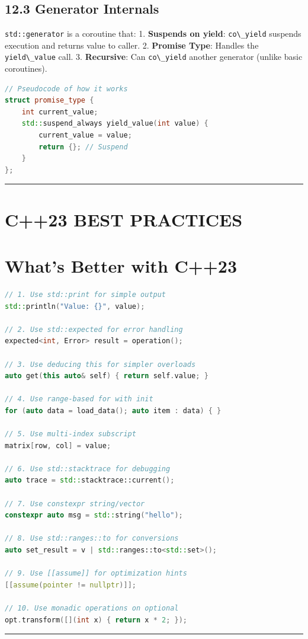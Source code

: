 \hypertarget{generator-internals}{%
\subsection{12.3 Generator Internals}\label{generator-internals}}

\passthrough{\lstinline!std::generator!} is a coroutine that: 1.
\textbf{Suspends on yield}: \passthrough{\lstinline!co\_yield!} suspends
execution and returns value to caller. 2. \textbf{Promise Type}: Handles
the \passthrough{\lstinline!yield\_value!} call. 3. \textbf{Recursive}:
Can \passthrough{\lstinline!co\_yield!} another generator (unlike basic
coroutines).

\begin{lstlisting}[language={C++}]
// Pseudocode of how it works
struct promise_type {
    int current_value;
    std::suspend_always yield_value(int value) {
        current_value = value;
        return {}; // Suspend
    }
};
\end{lstlisting}

\begin{center}\rule{0.5\linewidth}{0.5pt}\end{center}

\hypertarget{c23-best-practices}{%
\section{C++23 BEST PRACTICES}\label{c23-best-practices}}

\hypertarget{whats-better-with-c23}{%
\section{What's Better with C++23}\label{whats-better-with-c23}}

\begin{lstlisting}[language={C++}]
// 1. Use std::print for simple output
std::println("Value: {}", value);

// 2. Use std::expected for error handling
expected<int, Error> result = operation();

// 3. Use deducing this for simpler overloads
auto get(this auto& self) { return self.value; }

// 4. Use range-based for with init
for (auto data = load_data(); auto item : data) { }

// 5. Use multi-index subscript
matrix[row, col] = value;

// 6. Use std::stacktrace for debugging
auto trace = std::stacktrace::current();

// 7. Use constexpr string/vector
constexpr auto msg = std::string("hello");

// 8. Use std::ranges::to for conversions
auto set_result = v | std::ranges::to<std::set>();

// 9. Use [[assume]] for optimization hints
[[assume(pointer != nullptr)]];

// 10. Use monadic operations on optional
opt.transform([](int x) { return x * 2; });
\end{lstlisting}

\begin{center}\rule{0.5\linewidth}{0.5pt}\end{center}
